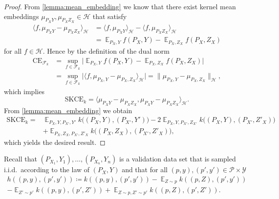 \documentclass{article}
\DeclareMathOperator{\Exp}{\mathbb{E}}
\begin{document}
\begin{proof}
From \cref{lemma:mean_embedding} we know that there exist
kernel mean embeddings
$ \mu_{P_X Y},  \mu_{P_X Z_X} \in \mathcal{H}$ that satisfy
\begin{equation*}
    \begin{split}
        \langle f,  \mu_{P_X Y} -  \mu_{P_X Z_X} \rangle_{\mathcal{H}}
        &= \langle f,  \mu_{P_X Y} \rangle_{\mathcal{H}} - \langle f,  \mu_{P_X Z_X} \rangle_{\mathcal{H}} \\
        &= \Exp_{P_X,Y} f(P_X, Y) - \Exp_{P_X,Z_X} f(P_X, Z_X)
    \end{split}
\end{equation*}
for all $f \in \mathcal{H}$. Hence by the definition of the dual norm
\begin{equation*}
    \begin{split}
        \mathrm{CE}_{\mathcal{F}_k} &= \sup_{f \in \mathcal{F}_k} \big|\Exp_{P_X,Y} f(P_X, Y) - \Exp_{P_X,Z_X} f(P_X, Z_X) \big| \\
        &= \sup_{f \in \mathcal{F}_k} \big|\langle f,  \mu_{P_X,Y} -  \mu_{P_X,Z_X} \rangle_{\mathcal{H}}\big|
        = \|\mu_{P_X,Y} -  \mu_{P_X,Z_X}\|_{\mathcal{H}},
    \end{split}
\end{equation*}
which implies
\begin{equation*}
    \mathrm{SKCE}_k = \langle \mu_{P_X Y} -  \mu_{P_X Z_X}, \mu_{P_X Y} -  \mu_{P_X Z_X} \rangle_{\mathcal{H}}.
\end{equation*}
From \cref{lemma:mean_embedding} we obtain
\begin{equation*}
    \begin{split}
        \mathrm{SKCE}_k ={}& \Exp_{P_X,Y,P_{X'},Y'} k\big((P_X,Y), (P_{X'}, Y')\big) - 2 \Exp_{P_X,Y,P_{X'},Z_{X'}} k\big((P_X, Y), (P_{X'}, Z'_X)\big) \\
        &+ \Exp_{P_X,Z_X,P_{X'},Z'_X} k\big((P_X, Z_X), (P_{X'}, Z'_X)\big),
    \end{split}
\end{equation*}
which yields the desired result.
\end{proof}

Recall that $(P_{X_1}, Y_1), \ldots, (P_{X_n}, Y_n)$ is
a validation data set that is sampled i.i.d.\ according to
the law of $(P_X, Y)$ and that for all
$(p, y), (p', y') \in \mathcal{P} \times \mathcal{Y}$
\begin{multline*}
    h((p, y), (p', y')) \coloneqq k((p, y), (p', y')) - \Exp_{Z \sim p} k((p, Z), (p', y')) \\
    - \Exp_{Z' \sim p'} k((p, y), (p', Z')) + \Exp_{Z \sim p, Z' \sim p'} k((p, Z), (p', Z')).
\end{multline*}
\end{document}
